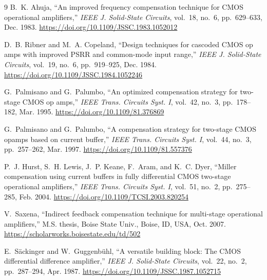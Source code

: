 \documentclass[journal]{IEEEtran}
\begin{document}
\begin{thebibliography}{9}
B.~K. Ahuja, ``An improved frequency compensation technique for CMOS operational amplifiers,'' \emph{IEEE J. Solid-State Circuits}, vol.~18, no.~6, pp.~629--633, Dec. 1983.
\url{https://doi.org/10.1109/JSSC.1983.1052012}

D.~B. Ribner and M.~A. Copeland, ``Design techniques for cascoded CMOS op amps with improved PSRR and common-mode input range,'' \emph{IEEE J. Solid-State Circuits}, vol.~19, no.~6, pp.~919--925, Dec. 1984.
\url{https://doi.org/10.1109/JSSC.1984.1052246}

G.~Palmisano and G.~Palumbo, ``An optimized compensation strategy for two-stage CMOS op amps,'' \emph{IEEE Trans. Circuits Syst. I}, vol.~42, no.~3, pp.~178--182, Mar. 1995.
\url{https://doi.org/10.1109/81.376869}

G.~Palmisano and G.~Palumbo, ``A compensation strategy for two-stage CMOS opamps based on current buffer,'' \emph{IEEE Trans. Circuits Syst. I}, vol.~44, no.~3, pp.~257--262, Mar. 1997.
\url{https://doi.org/10.1109/81.557376}

P.~J. Hurst, S.~H. Lewis, J.~P. Keane, F.~Aram, and K.~C. Dyer, ``Miller compensation using current buffers in fully differential CMOS two-stage operational amplifiers,'' \emph{IEEE Trans. Circuits Syst. I}, vol.~51, no.~2, pp.~275--285, Feb. 2004.
\url{https://doi.org/10.1109/TCSI.2003.820254}

V.~Saxena, ``Indirect feedback compensation technique for multi-stage operational amplifiers,'' M.S. thesis, Boise State Univ., Boise, ID, USA, Oct. 2007.
\url{https://scholarworks.boisestate.edu/td/502}

E.~S\"ackinger and W.~Guggenb\"uhl, ``A versatile building block: The CMOS differential difference amplifier,'' \emph{IEEE J. Solid-State Circuits}, vol.~22, no.~2, pp.~287--294, Apr. 1987.
\url{https://doi.org/10.1109/JSSC.1987.1052715}
\end{thebibliography}
\end{document}
